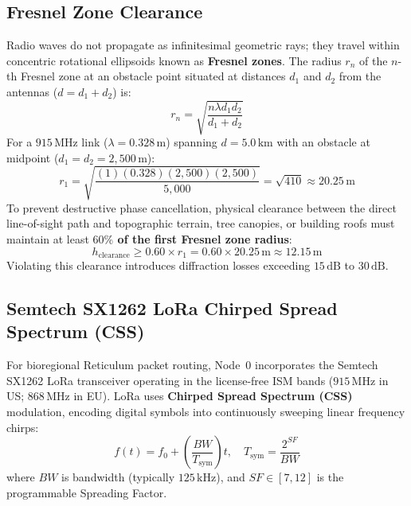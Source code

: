 \subsection{Fresnel Zone Clearance}
Radio waves do not propagate as infinitesimal geometric rays; they travel within concentric rotational ellipsoids known as \textbf{Fresnel zones}. The radius $r_n$ of the $n$-th Fresnel zone at an obstacle point situated at distances $d_1$ and $d_2$ from the antennas ($d = d_1 + d_2$) is:
\begin{equation}
r_n = \sqrt{ \frac{n \lambda d_1 d_2}{d_1 + d_2} }
\label{eq:fresnel_radius}
\end{equation}
For a $915\,\mathrm{MHz}$ link ($\lambda = 0.328\,\mathrm{m}$) spanning $d = 5.0\,\mathrm{km}$ with an obstacle at midpoint ($d_1 = d_2 = 2,500\,\mathrm{m}$):
\begin{equation}
r_1 = \sqrt{ \frac{(1)(0.328)(2,500)(2,500)}{5,000} } = \sqrt{410} \approx 20.25\,\mathrm{m}
\label{eq:fresnel_calc}
\end{equation}
To prevent destructive phase cancellation, physical clearance between the direct line-of-sight path and topographic terrain, tree canopies, or building roofs must maintain at least \textbf{$60\%$ of the first Fresnel zone radius}:
\begin{equation}
h_{\mathrm{clearance}} \ge 0.60 \times r_1 = 0.60 \times 20.25\,\mathrm{m} \approx 12.15\,\mathrm{m}
\label{eq:fresnel_60_clearance}
\end{equation}
Violating this clearance introduces diffraction losses exceeding $15\,\mathrm{dB}$ to $30\,\mathrm{dB}$.

\subsection{Semtech SX1262 LoRa Chirped Spread Spectrum (CSS)}
For bioregional Reticulum packet routing, Node~0 incorporates the Semtech SX1262 LoRa transceiver operating in the license-free ISM bands ($915\,\mathrm{MHz}$ in US; $868\,\mathrm{MHz}$ in EU). LoRa uses \textbf{Chirped Spread Spectrum (CSS)} modulation, encoding digital symbols into continuously sweeping linear frequency chirps:
\begin{equation}
f(t) = f_0 + \left( \frac{BW}{T_{\mathrm{sym}}} \right) t, \quad T_{\mathrm{sym}} = \frac{2^{SF}}{BW}
\label{eq:lora_chirp_rate}
\end{equation}
where $BW$ is bandwidth (typically $125\,\mathrm{kHz}$), and $SF \in [7, 12]$ is the programmable Spreading Factor.

